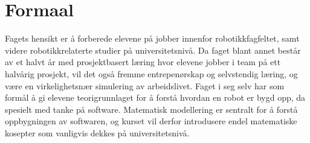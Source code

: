 \section*{Formaal} \label{Sec: Formaal}


	Fagets hensikt er å forberede elevene på jobber innenfor robotikkfagfeltet, samt videre robotikkrelaterte studier på universitetsnivå. Da faget blant annet består av et halvt år med prosjektbasert læring hvor elevene jobber i team på ett halvårig prosjekt, vil det også fremme entrepenørskap og selvstendig læring, og være en virkelighetsnær simulering av arbeidslivet.
	Faget i seg selv har som formål å gi elevene teorigrunnlaget for å forstå hvordan en robot er bygd opp, da spesielt med tanke på software. Matematisk modellering er sentralt for å forstå oppbygningen av softwaren, og kurset vil derfor introdusere endel matematiske kosepter som vanligvis dekkes på universitetsnivå.
